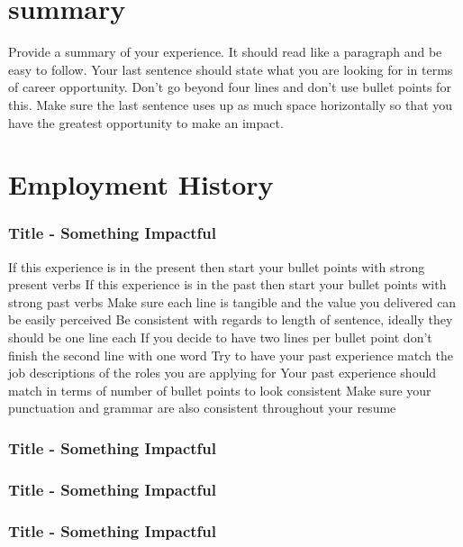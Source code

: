 \documentclass{brian_ats}
\begin{document}
\section{summary}
Provide a summary of your experience. It should read like a paragraph and be easy to follow. Your last sentence should state what you are looking for in terms of career opportunity. Don’t go beyond four lines and don’t use bullet points for this. Make sure the last sentence uses up as much space horizontally so that you have the greatest opportunity to make an impact.
\section{Employment History}
\subsubsection{Title - Something Impactful}
\employmenthistory
{ If this experience is in the present then start your bullet points with strong present verbs}
{If this experience is in the past then start your bullet points with strong past verbs}
{ Make sure each line is tangible and the value you delivered can be easily perceived}
{ Be consistent with regards to length of sentence, ideally they should be one line each}
{ If you decide to have two lines per bullet point don’t finish the second line with one word}
{Try to have your past experience match the job descriptions of the roles you are applying for}
{ Your past experience should match in terms of number of bullet points to look consistent}
{ Make sure your punctuation and grammar are also consistent throughout your resume}

\subsubsection{Title - Something Impactful}
\employmenthistory{}{}{}{}{}{}{}{}

\subsubsection{Title - Something Impactful}
\employmenthistory{}{}{}{}{}{}{}{}

\subsubsection{Title - Something Impactful}
\end{document}
